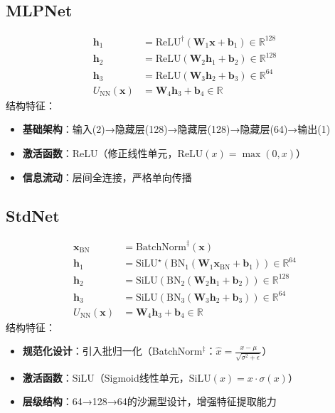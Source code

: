 \documentclass[11pt]{article}
\begin{document}
\subsection{MLPNet}
\begin{align*}
    \mathbf{h}_1              & = \text{ReLU}^\dagger(\mathbf{W}_1 \mathbf{x} + \mathbf{b}_1) \in \mathbb{R}^{128} \\
    \mathbf{h}_2              & = \text{ReLU}(\mathbf{W}_2 \mathbf{h}_1 + \mathbf{b}_2) \in \mathbb{R}^{128}       \\
    \mathbf{h}_3              & = \text{ReLU}(\mathbf{W}_3 \mathbf{h}_2 + \mathbf{b}_3) \in \mathbb{R}^{64}        \\
    U_{\text{NN}}(\mathbf{x}) & = \mathbf{W}_4 \mathbf{h}_3 + \mathbf{b}_4 \in \mathbb{R}
\end{align*}
结构特征：
\begin{itemize}[leftmargin=2em]
    \item \textbf{基础架构}：输入(2)→隐藏层(128)→隐藏层(128)→隐藏层(64)→输出(1)
    \item \textbf{激活函数}：ReLU（修正线性单元，$\text{ReLU}(x)=\max(0,x)$）
    \item \textbf{信息流动}：层间全连接，严格单向传播
\end{itemize}

\subsection{StdNet}
\begin{align*}
    \mathbf{x}_{\text{BN}}    & = \text{BatchNorm}^\ddagger(\mathbf{x})                                                                  \\
    \mathbf{h}_1              & = \text{SiLU}^\star(\text{BN}_1(\mathbf{W}_1 \mathbf{x}_{\text{BN}} + \mathbf{b}_1)) \in \mathbb{R}^{64} \\
    \mathbf{h}_2              & = \text{SiLU}(\text{BN}_2(\mathbf{W}_2 \mathbf{h}_1 + \mathbf{b}_2)) \in \mathbb{R}^{128}                \\
    \mathbf{h}_3              & = \text{SiLU}(\text{BN}_3(\mathbf{W}_3 \mathbf{h}_2 + \mathbf{b}_3)) \in \mathbb{R}^{64}                 \\
    U_{\text{NN}}(\mathbf{x}) & = \mathbf{W}_4 \mathbf{h}_3 + \mathbf{b}_4 \in \mathbb{R}
\end{align*}
结构特征：
\begin{itemize}[leftmargin=2em]
    \item \textbf{规范化设计}：引入批归一化（BatchNorm$^\ddagger$：$\hat{x}=\frac{x-\mu}{\sqrt{\sigma^2+\epsilon}}$）
    \item \textbf{激活函数}：SiLU（Sigmoid线性单元，$\text{SiLU}(x)=x\cdot\sigma(x)$）
    \item \textbf{层级结构}：64→128→64的沙漏型设计，增强特征提取能力
\end{itemize}
\end{document}
